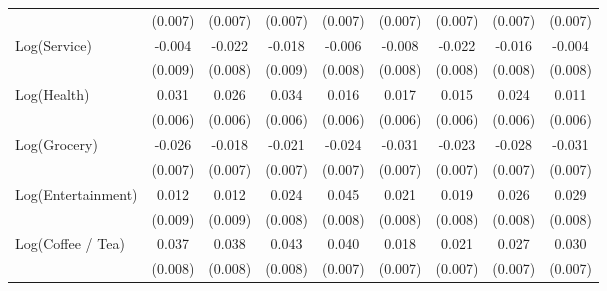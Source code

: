 {\begin{tabular}{l*{8}{c}}
                    &     (0.007)         &     (0.007)         &     (0.007)         &     (0.007)         &     (0.007)         &     (0.007)         &     (0.007)         &     (0.007)         \\
Log(Service)        &      -0.004         &      -0.022\sym{**} &      -0.018\sym{**} &      -0.006         &      -0.008         &      -0.022\sym{**} &      -0.016\sym{**} &      -0.004         \\
                    &     (0.009)         &     (0.008)         &     (0.009)         &     (0.008)         &     (0.008)         &     (0.008)         &     (0.008)         &     (0.008)         \\
Log(Health)         &       0.031\sym{***}&       0.026\sym{***}&       0.034\sym{***}&       0.016\sym{**} &       0.017\sym{**} &       0.015\sym{**} &       0.024\sym{***}&       0.011\sym{*}  \\
                    &     (0.006)         &     (0.006)         &     (0.006)         &     (0.006)         &     (0.006)         &     (0.006)         &     (0.006)         &     (0.006)         \\
Log(Grocery)        &      -0.026\sym{***}&      -0.018\sym{**} &      -0.021\sym{**} &      -0.024\sym{***}&      -0.031\sym{***}&      -0.023\sym{***}&      -0.028\sym{***}&      -0.031\sym{***}\\
                    &     (0.007)         &     (0.007)         &     (0.007)         &     (0.007)         &     (0.007)         &     (0.007)         &     (0.007)         &     (0.007)         \\
Log(Entertainment)  &       0.012         &       0.012         &       0.024\sym{***}&       0.045\sym{***}&       0.021\sym{**} &       0.019\sym{**} &       0.026\sym{***}&       0.029\sym{***}\\
                    &     (0.009)         &     (0.009)         &     (0.008)         &     (0.008)         &     (0.008)         &     (0.008)         &     (0.008)         &     (0.008)         \\
Log(Coffee / Tea)   &       0.037\sym{***}&       0.038\sym{***}&       0.043\sym{***}&       0.040\sym{***}&       0.018\sym{**} &       0.021\sym{***}&       0.027\sym{***}&       0.030\sym{***}\\
                    &     (0.008)         &     (0.008)         &     (0.008)         &     (0.007)         &     (0.007)         &     (0.007)         &     (0.007)         &     (0.007)         \\

\end{tabular}}
